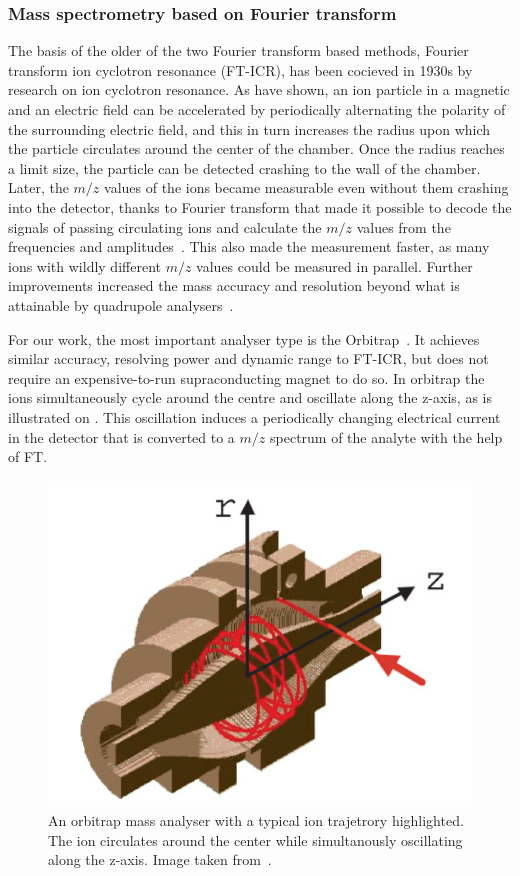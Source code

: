 \subsubsection{Mass spectrometry based on Fourier transform}

The basis of the older of the two Fourier transform based methods, Fourier transform ion cyclotron resonance (FT-ICR), has been cocieved in 1930s by research on ion cyclotron resonance. As \citet{lawrence1932production} have shown, an ion particle in a magnetic and an electric field can be accelerated by periodically alternating the polarity of the surrounding electric field, and this in turn increases the radius upon which the particle circulates around the center of the chamber. Once the radius reaches a limit size, the particle can be detected crashing to the wall of the chamber. Later, the \(m/z\) values of the ions became measurable even without them crashing into the detector, thanks to Fourier transform that made it possible to decode the signals of passing circulating ions and calculate the \(m/z\) values from the frequencies and amplitudes~\cite{comisarow1974fourier}. This also made the measurement faster, as many ions with wildly different \(m/z\) values could be measured in parallel. Further improvements increased the mass accuracy and resolution beyond what is attainable by quadrupole analysers~\cite{amster1996fourier, easterling1999routine}.

For our work, the most important analyser type is the Orbitrap~\cite{hu2005orbitrap}. It achieves similar accuracy, resolving power and dynamic range to FT-ICR, but does not require an expensive-to-run supraconducting magnet to do so. In orbitrap the ions simultaneously cycle around the centre and oscillate along the z-axis, as is illustrated on . This oscillation induces a periodically changing electrical current in the detector that is converted to a \(m/z\) spectrum of the analyte with the help of FT\@.

\begin{figure}
  \centering
  \includegraphics[width=.5\linewidth]{img/orbitrap.png}
  \caption{An orbitrap mass analyser with a typical ion trajetrory highlighted. The ion circulates around the center while simultanously oscillating along the z-axis. Image taken from~\citet{hu2005orbitrap}.}\label{fig:orbitrap}
\end{figure}

